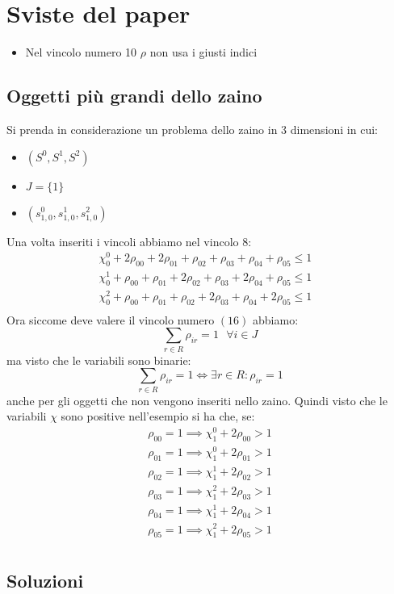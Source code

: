 \documentclass{scrartcl}
\begin{document}
\section{Sviste del paper}
\begin{itemize}
	\item Nel vincolo numero 10 $\rho$ non usa i giusti indici
\end{itemize}

\subsection{Oggetti più grandi dello zaino}
Si prenda in considerazione un problema dello zaino in 3 dimensioni in cui:
\begin{itemize}
	\item $(S^0,S^1,S^2)$
	\item $J = \{1\}$
	\item $(s_{1, 0}^0,s_{1,0}^1, s_{1,0}^2)$
\end{itemize}
Una volta inseriti i vincoli abbiamo nel vincolo 8:
$$
\begin{array}{ll}
\chi_0^0 + 2 \rho_{00} + 2 \rho_{01} + \rho_{02} + \rho_{03} + \rho_{04} + \rho_{05} \leq 1 & \\
\chi_0^1 +  \rho_{00} +  \rho_{01} + 2 \rho_{02} + \rho_{03} + 2 \rho_{04} + \rho_{05} \leq 1 & \\
\chi_0^2 +  \rho_{00} +  \rho_{01} + \rho_{02} + 2 \rho_{03} + \rho_{04} + 2 \rho_{05} \leq 1 & \\
\end{array}
$$
Ora siccome deve valere il vincolo numero $(16)$ abbiamo:
$$
\sum_{r\in R} \rho_{ir} = 1 \ \ \ \forall i \in J
$$
ma visto che le variabili sono binarie:
$$
\sum_{r\in R} \rho_{ir} = 1 \iff \exists r \in R : \rho_{ir} = 1
$$
anche per gli oggetti che non vengono inseriti nello zaino.
Quindi visto che le variabili $\chi$ sono positive nell'esempio si ha che, se:
$$
\begin{array}{l}
\rho_{00} = 1 \implies \chi_1^0 + 2 \rho_{00} > 1 \\
\rho_{01} = 1 \implies \chi_1^0 + 2 \rho_{01} > 1 \\
\rho_{02} = 1 \implies \chi_1^1 + 2 \rho_{02} > 1 \\
\rho_{03} = 1 \implies \chi_1^2 + 2 \rho_{03} > 1 \\
\rho_{04} = 1 \implies \chi_1^1 + 2 \rho_{04} > 1 \\
\rho_{05} = 1 \implies \chi_1^2 + 2 \rho_{05} > 1 \\
\end{array}
$$

\subsection{Soluzioni}
\end{document}
